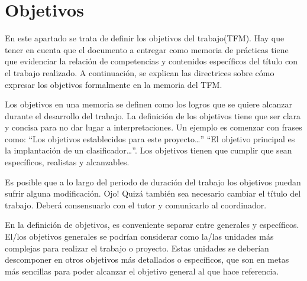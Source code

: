 
\section{Objetivos}

En este apartado se trata de definir los objetivos del trabajo(TFM). Hay que tener en cuenta que el documento a entregar como memoria de prácticas tiene que evidenciar la relación de competencias y contenidos específicos del título con el trabajo realizado. A continuación, se explican las directrices sobre cómo expresar los objetivos formalmente en la memoria del TFM.

Los objetivos en una memoria se definen como los logros que se quiere alcanzar durante el desarrollo del trabajo. La definición de los objetivos tiene que ser clara y concisa para no dar lugar a interpretaciones. Un ejemplo es comenzar con frases como: “Los objetivos establecidos para este proyecto…” “El objetivo principal es la implantación de un clasificador…”. Los objetivos tienen que cumplir que sean específicos, realistas y alcanzables.

Es posible que a lo largo del periodo de duración del trabajo los objetivos puedan sufrir alguna modificación. Ojo! Quizá también sea necesario cambiar el título del trabajo. Deberá consensuarlo con el tutor y comunicarlo al coordinador.

En la definición de objetivos, es conveniente separar entre generales y específicos. El/los objetivos generales se podrían considerar como la/las unidades más complejas para realizar el trabajo o proyecto. Estas unidades se deberían descomponer en otros objetivos más detallados o específicos, que son en metas más sencillas para poder alcanzar el objetivo general al que hace referencia.
